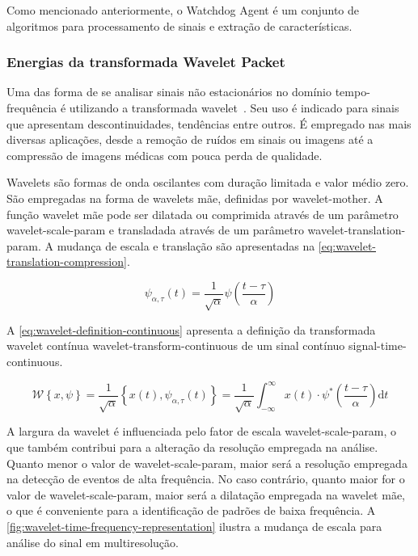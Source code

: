 Como mencionado anteriormente, o Watchdog Agent é um conjunto de algoritmos para processamento de
sinais e extração de características.


\subsubsection{Energias da transformada Wavelet Packet}

Uma das forma de se analisar sinais não estacionários no domínio tempo-frequência é utilizando a
transformada wavelet~\cite{antonini1992image}. Seu uso é indicado para sinais que apresentam
descontinuidades, tendências entre outros. É empregado nas mais diversas aplicações, desde a remoção
de ruídos em sinais ou imagens até a compressão de imagens médicas com pouca perda de qualidade.

Wavelets são formas de onda oscilantes com duração limitada e valor médio zero. São empregadas na
forma de wavelets mãe, definidas por \gls{wavelet-mother}. A função wavelet mãe pode ser dilatada ou
comprimida através de um parâmetro \gls{wavelet-scale-param} e transladada através de um
parâmetro \gls{wavelet-translation-param}. A mudança de escala e translação são apresentadas na
\cref{eq:wavelet-translation-compression}.

\begin{equation}
  \psi_{\alpha, \tau}(t) = \frac{1}{\sqrt{\alpha}} \psi \left ( \frac{t - \tau}{\alpha} \right )
  \label{eq:wavelet-translation-compression}
\end{equation}

A \cref{eq:wavelet-definition-continuous} apresenta a definição da transformada wavelet contínua
\gls{wavelet-transform-continuous} de um sinal contínuo \gls{signal-time-continuous}.

\begin{equation}
  \mathcal{W} \left \{ x, \psi \right \} =
      \frac{1}{\sqrt{\alpha}} \left \{ x(t), \psi_{\alpha, \tau}(t) \right \} =
      \frac{1}{\sqrt{\alpha}} \int_{-\infty}^{\infty} x(t) \cdot
        \psi^{*} \left ( \frac{t - \tau}{\alpha} \right ) \textrm{d}t
  \label{eq:wavelet-definition-continuous}
\end{equation}

A largura da wavelet é influenciada pelo fator de escala \gls{wavelet-scale-param}, o que também
contribui para a alteração da resolução empregada na análise. Quanto menor o valor de
\gls{wavelet-scale-param}, maior será a resolução empregada na detecção de eventos de alta
frequência. No caso contrário, quanto maior for o valor de \gls{wavelet-scale-param}, maior será a
dilatação empregada na wavelet mãe, o que é conveniente para a identificação de padrões de baixa
frequência. A \cref{fig:wavelet-time-frequency-representation} ilustra a mudança de escala para
análise do sinal em multiresolução.

